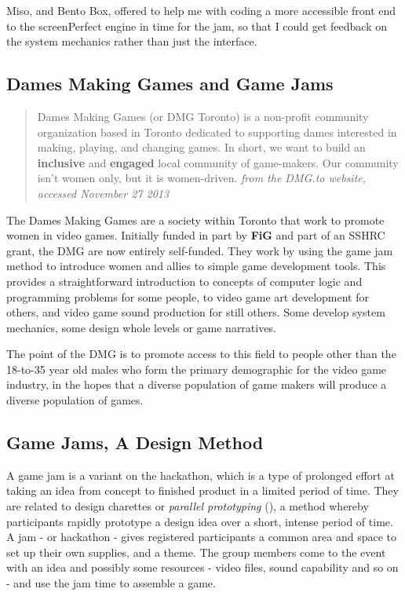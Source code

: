 Miso, and Bento Box, offered to help me with coding a more accessible front end to the screenPerfect engine in time for the jam, so that I could get feedback on the system mechanics rather than just the interface.

\subsection{Dames Making Games and Game Jams}

\begin{quote}
Dames Making Games (or DMG Toronto) is a non-profit community organization based in Toronto dedicated to supporting dames interested in making, playing, and changing games. In short, we want to build an \textbf{inclusive} and \textbf{engaged} local community of game-makers. Our community isn't women only, but it is women-driven.
\textit{from the DMG.to website, accessed \cite{dmgto} November 27 2013}
\end{quote}

The Dames Making Games are a society within Toronto that work to promote women in video games. Initially funded in part by \textbf{FiG} and part of an SSHRC grant, the DMG are now entirely self-funded. They work by using the game jam method to introduce women and allies to simple game development tools. This provides a straightforward introduction to concepts of computer logic and programming problems for some people, to video game art development for others, and video game sound production for still others. Some develop system mechanics, some design whole levels or game narratives. 

The point of the DMG is to promote access to this field to people other than the 18-to-35 year old males who form the primary demographic for the video game industry, in the hopes that a diverse population of game makers will produce a diverse population of games. 


\subsection{Game Jams, A Design Method}

A game jam is a variant on the hackathon, which is a type of prolonged effort at taking an idea from concept to finished product in a limited period of time. They are related to design charettes or \textit{parallel prototyping} (\cite{charette}), a method whereby participants rapidly prototype a design idea over a short, intense period of time. A jam - or hackathon - gives registered participants a common area and space to set up their own supplies, and a theme. The group members come to the event with an idea and possibly some resources - video files, sound capability and so on - and use the jam time to assemble a game.

